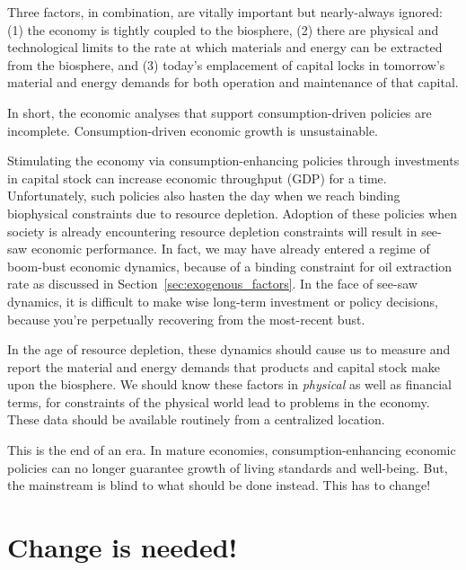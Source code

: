 Three factors, in combination, are vitally important 
but nearly-always ignored: (1) the economy is tightly coupled to the biosphere, 
(2) there are physical and technological limits 
			to the rate at which materials and energy can be extracted 
			from the biosphere, and (3) today's emplacement of capital locks in
			tomorrow's material and energy demands 
			for both operation and maintenance of that capital.

In short, the economic analyses that support 
consumption-driven policies are incomplete.
Consumption-driven economic growth is unsustainable.

Stimulating the economy via consumption-enhancing policies through investments 
in capital stock 
can increase economic throughput (GDP) for a time.
Unfortunately, such policies also
hasten the day when we reach binding biophysical constraints
due to resource depletion. 
Adoption of these policies when society is already encountering
resource depletion constraints
will result in see-saw economic performance. 
In fact, we may have already entered a regime of boom-bust economic dynamics,
because of a binding constraint for oil extraction rate
as discussed in Section~\ref{sec:exogenous_factors}.
In the face of see-saw dynamics,
it is difficult to make wise long-term investment or policy decisions,
because you're perpetually recovering from the most-recent bust.

In the age of resource depletion, 
these dynamics should cause us to measure and report
the material and energy demands that products and capital stock 
make upon the biosphere.
We should know these factors 
in \emph{physical} as well as financial terms,
for constraints of the physical world 
lead to problems in the economy.
These data should be available routinely from a centralized location.

This is the end of an era.
In mature economies, consumption-enhancing 
economic policies can no longer guarantee 
growth of living standards and well-being.
But, the mainstream is blind to what should be done instead. 
This has to change!


\section{Change is needed!}%
\label{sec:change_needed}

